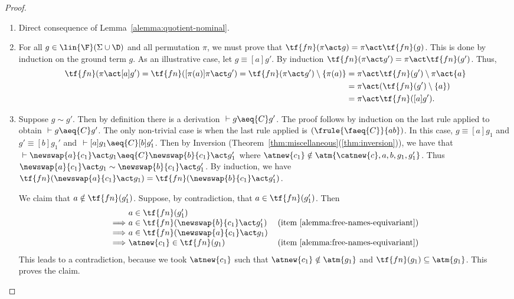 \begin{proof}
\begin{enumerate}
    \item Direct consequence of Lemma~\ref{alemma:quotient-nominal}.

    \item For all $g\in \lin{\F}(\Sigma\cup\D)$ and all permutation $\pi$, we must prove that $\tf{fn}(\pi\act g) = \pi\act\tf{fn}(g)$. This is done by induction on the ground term $g$. As an illustrative case, let $g\equiv [a]g'$. By induction $\tf{fn}(\pi\act g') = \pi\act \tf{fn}(g')$. Thus,
    \begin{align*}
         \tf{fn}(\pi\act[a]g') = \tf{fn}([\pi(a)]\pi\act g') = \tf{fn}(\pi\act g') \setminus \{\pi(a)\}
         &= \pi\act \tf{fn}(g') \setminus \pi\act \{a\} \\
         &= \pi\act(\tf{fn}(g')\setminus\{a\})\\
         &= \pi\act \tf{fn}([a]g').
    \end{align*}

    \item Suppose $g \sim g'$. Then by definition there is a derivation $~\vdash g \aeq{C} g'$. The proof follows by induction on the last rule applied to obtain  $~\vdash g \aeq{C} g'$. The only non-trivial case is when the last rule applied is $(\frule{\faeq{C}}{ab})$. In this case, $g \equiv [a]g_1$ and $g' \equiv [b]g_1'$ and $~\vdash [a]g_1 \aeq{C} [b]g_1'$. Then by Inversion (Theorem~\ref{thm:miscellaneous}(\ref{thm:inversion})), we have that $~\vdash \newswap{a}{c_1}\act g_1 \aeq{C} \newswap{b}{c_1}\act g_1'$ where $\atnew{c_1}\notin \atm{\catnew{c},a,b,g_1,g_1'}$. Thus $\newswap{a}{c_1}\act g_1 \sim \newswap{b}{c_1}\act g_1'$. By induction, we have $\tf{fn}(\newswap{a}{c_1}\act g_1) = \tf{fn}(\newswap{b}{c_1}\act g_1')$.
    
    \begin{claim}[1]
         We claim that $a\notin \tf{fn}(g_1')$. Suppose, by contradiction, that $a\in \tf{fn}(g_1')$. Then
        \begin{equation*}
            \begin{tabular}{@{}l@{ }ll@{}}
               & $a \in\tf{fn}(g_1')$ &  \\
              $\Longrightarrow$ & $a \in\tf{fn}(\newswap{b}{c_1} \act g_1')$ & (item~\ref{alemma:free-names-equivariant})\\
              $\Longrightarrow$ & $a \in\tf{fn}(\newswap{a}{c_1} \act g_1)$ & \\
           $\Longrightarrow$ & $\atnew{c_1} \in\tf{fn}(g_1)$ & (item~\ref{alemma:free-names-equivariant})
            \end{tabular}
        \end{equation*}
        This leads to a contradiction, because we took $\atnew{c_1}$ such that $\atnew{c_1}\notin \atm{g_1}$ and $\tf{fn}(g_1) \subseteq \atm{g_1}$. This proves the claim.
    \end{claim}


\end{enumerate}
\end{proof}
